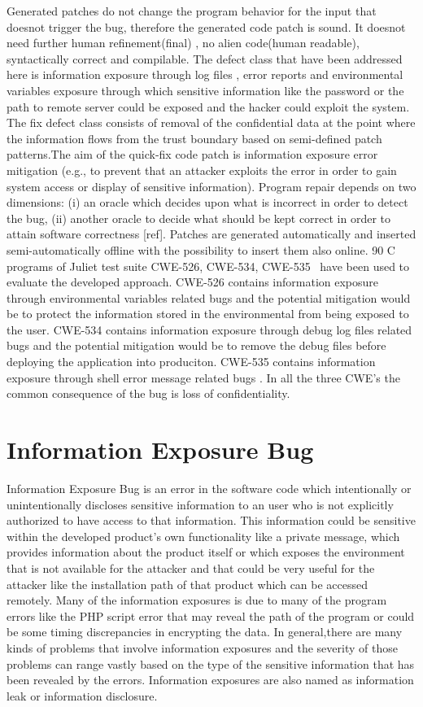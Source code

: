 Generated patches do not change the program behavior for the input that doesnot trigger the bug, therefore the generated code patch
is sound. It doesnot need further human refinement(final) , no alien code(human readable), syntactically correct and compilable.
The defect class that have been addressed here is information exposure through log files , error reports and environmental variables exposure through
which sensitive information like the password or the path to remote server could be exposed and the hacker could exploit the system.
The fix defect class consists of removal of the confidential data at the point where the information flows from the
trust boundary based on semi-defined patch patterns.The aim of the quick-fix code patch is 
information exposure error mitigation (e.g., to prevent
that an attacker exploits the error in order to gain system access or display of sensitive information).
Program repair depends on two dimensions: (i) an oracle which decides upon what is incorrect in order to detect the bug, (ii)
another oracle to decide what should be kept correct in order to attain software correctness [ref]. 
Patches are generated automatically and inserted semi-automatically offline
with the possibility to insert them also online.
90 C programs of Juliet test suite CWE-526, CWE-534, CWE-535~\cite{mitre:CWE} have been used to evaluate the developed approach. 
CWE-526 contains
information exposure through environmental variables related bugs and the potential mitigation would be to protect the 
information stored in the environmental from being exposed to the user. CWE-534 contains information 
exposure through debug log files related bugs and the potential mitigation would be to remove the 
debug files before deploying the application into produciton. CWE-535 contains information exposure through
shell error message related bugs . In all the three CWE's the common consequence of the bug is
loss of confidentiality.




\section{Information Exposure Bug}

Information Exposure Bug is an error in the software code which intentionally or unintentionally discloses sensitive information to an user who is 
not explicitly authorized to have access to that information.
This information could be sensitive within the developed product's own functionality like a private message, which provides information
about the product itself or which exposes the environment that is not available for the attacker and that could be very useful for the attacker like the 
installation path of that product which can be accessed remotely.
Many of the information exposures is due to many of the program errors like the PHP script error that may reveal the path of the program or
could be some timing discrepancies in encrypting the data. In general,there are many kinds of problems that involve information exposures and the severity
of those problems can range vastly based on the type of the sensitive information that has been revealed by the errors.
Information exposures are also named as information leak or information disclosure.

